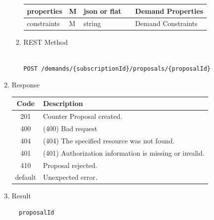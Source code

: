 \begin{enumerate}
\begin{enumerate}
\begin{table}[H]
\begin{center}
\begin{tabular}{|p{3cm}|l|p{3cm}|p{3cm}|p{4cm}|}
properties		& M &	json or flat 	&		& Demand Properties		\\
\hline

constraints 	& M &	string			&		& Demand Constraints		\\
\hline

\end{tabular}
\end{center}

\end{table}

\item REST Method

\begin{tcolorbox}[boxrule=0pt, frame empty]
\begin{verbatim} 

POST /demands/{subscriptionId}/proposals/{proposalId}

\end{verbatim}
\end{tcolorbox}

\end{enumerate}

\item Response

\begin{table}[H]
\footnotesize

\begin{center}
\begin{tabular}{|c|l|} 
\hline
\rowcolor{lightgray}	Code 		& 	Description \\
\hline
201	 		&	Counter Proposal created.  \\
\hline
400			&	(400) Bad request	\\
\hline
404			&	(404) The specified resource was not found. \\
\hline
401			&	(401) Authorization information is missing or invalid. \\
\hline
410			&	Proposal rejected. \\
\hline
default		&	Unexpected error. \\
\hline
\end{tabular}
\end{center}

\end{table}

\item Result

\begin{tcolorbox}[boxrule=0pt, frame empty]
\begin{verbatim}
  proposalId
\end{verbatim}
\end{tcolorbox}


\end{enumerate}

